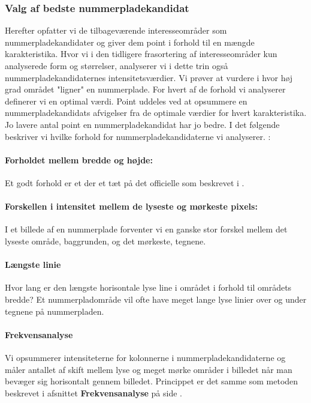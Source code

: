 \subsubsection{Valg af bedste nummerpladekandidat}
\label{sec:GetBestCandidate}
Herefter opfatter vi de tilbageværende interesseområder som nummerpladekandidater og giver dem point i forhold til en mængde karakteristika. Hvor vi i den tidligere frasortering af interesseområder kun analyserede form og størrelser, analyserer vi i dette trin også nummerpladekandidaternes intensitetsværdier. Vi prøver at vurdere i hvor høj grad området "ligner" en nummerplade. For hvert af de forhold vi analyserer definerer vi en optimal værdi. Point uddeles ved at opsummere en nummerpladekandidats afvigelser fra de optimale værdier for hvert karakteristika. Jo lavere antal point en nummerpladekandidat har jo bedre. I det følgende beskriver vi hvilke forhold for nummerpladekandidaterne vi analyserer. :

\paragraph*{Forholdet mellem bredde og højde:}
Et godt forhold er et der et tæt på det officielle som beskrevet i \cite{dkplates}.

\paragraph*{Forskellen i intensitet mellem de lyseste og mørkeste pixels:}
I et billede af en nummerplade forventer vi en ganske stor forskel mellem det lyseste område, baggrunden, og det mørkeste, tegnene.

\paragraph*{Længste linie}
Hvor lang er den længste horisontale lyse line i området i forhold til områdets bredde? Et nummerpladområde vil ofte have meget lange lyse linier over og under tegnene på nummerpladen.

\paragraph*{Frekvensanalyse}
Vi opsummerer intensiteterne for kolonnerne i nummerpladekandidaterne og måler antallet af skift mellem lyse og meget mørke områder i billedet når man bevæger sig horisontalt gennem billedet. Princippet er det samme som metoden beskrevet i afsnittet \textbf{Frekvensanalyse} på side \pageref{sec:DetectPlateness}. 

